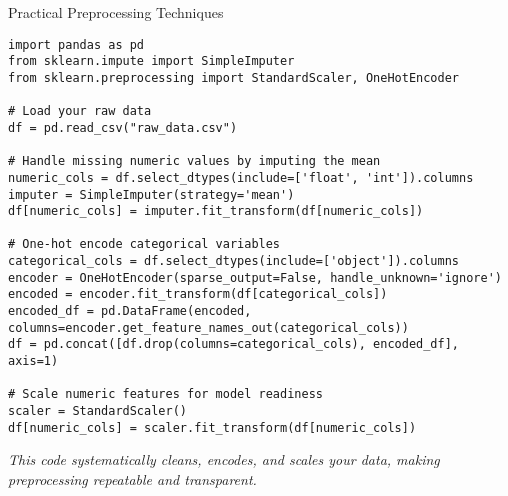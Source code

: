 \documentclass[aspectratio=169]{beamer}
\begin{document}
%
%
\begin{frame}{Practical Preprocessing Techniques}
\begin{verbatim}
import pandas as pd
from sklearn.impute import SimpleImputer
from sklearn.preprocessing import StandardScaler, OneHotEncoder

# Load your raw data
df = pd.read_csv("raw_data.csv")

# Handle missing numeric values by imputing the mean
numeric_cols = df.select_dtypes(include=['float', 'int']).columns
imputer = SimpleImputer(strategy='mean')
df[numeric_cols] = imputer.fit_transform(df[numeric_cols])

# One-hot encode categorical variables
categorical_cols = df.select_dtypes(include=['object']).columns
encoder = OneHotEncoder(sparse_output=False, handle_unknown='ignore')
encoded = encoder.fit_transform(df[categorical_cols])
encoded_df = pd.DataFrame(encoded, columns=encoder.get_feature_names_out(categorical_cols))
df = pd.concat([df.drop(columns=categorical_cols), encoded_df], axis=1)

# Scale numeric features for model readiness
scaler = StandardScaler()
df[numeric_cols] = scaler.fit_transform(df[numeric_cols])
\end{verbatim}

\vspace{0.8em}
\emph{This code systematically cleans, encodes, and scales your data, making preprocessing repeatable and transparent.}
\end{frame}
\end{document}
